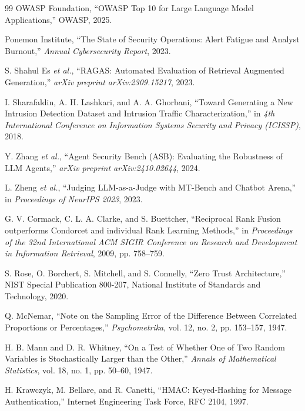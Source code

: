 \documentclass[12pt,a4paper]{article}
\begin{document}
\begin{thebibliography}{99}
    OWASP Foundation, ``OWASP Top 10 for Large Language Model Applications,'' OWASP, 2025.

    Ponemon Institute, ``The State of Security Operations: Alert Fatigue and Analyst Burnout,'' \emph{Annual Cybersecurity Report}, 2023.

    S. Shahul Es \emph{et al.}, ``RAGAS: Automated Evaluation of Retrieval Augmented Generation,'' \emph{arXiv preprint arXiv:2309.15217}, 2023.

    I. Sharafaldin, A. H. Lashkari, and A. A. Ghorbani, ``Toward Generating a New Intrusion Detection Dataset and Intrusion Traffic Characterization,'' in \emph{4th International Conference on Information Systems Security and Privacy (ICISSP)}, 2018.

    Y. Zhang \emph{et al.}, ``Agent Security Bench (ASB): Evaluating the Robustness of LLM Agents,'' \emph{arXiv preprint arXiv:2410.02644}, 2024.

    L. Zheng \emph{et al.}, ``Judging LLM-as-a-Judge with MT-Bench and Chatbot Arena,'' in \emph{Proceedings of NeurIPS 2023}, 2023.

    G. V. Cormack, C. L. A. Clarke, and S. Buettcher, ``Reciprocal Rank Fusion outperforms Condorcet and individual Rank Learning Methods,'' in \emph{Proceedings of the 32nd International ACM SIGIR Conference on Research and Development in Information Retrieval}, 2009, pp. 758--759.

    S. Rose, O. Borchert, S. Mitchell, and S. Connelly, ``Zero Trust Architecture,'' NIST Special Publication 800-207, National Institute of Standards and Technology, 2020.

    Q. McNemar, ``Note on the Sampling Error of the Difference Between Correlated Proportions or Percentages,'' \emph{Psychometrika}, vol. 12, no. 2, pp. 153--157, 1947.

    H. B. Mann and D. R. Whitney, ``On a Test of Whether One of Two Random Variables is Stochastically Larger than the Other,'' \emph{Annals of Mathematical Statistics}, vol. 18, no. 1, pp. 50--60, 1947.

    H. Krawczyk, M. Bellare, and R. Canetti, ``HMAC: Keyed-Hashing for Message Authentication,'' Internet Engineering Task Force, RFC 2104, 1997.

\end{thebibliography}
\end{document}
